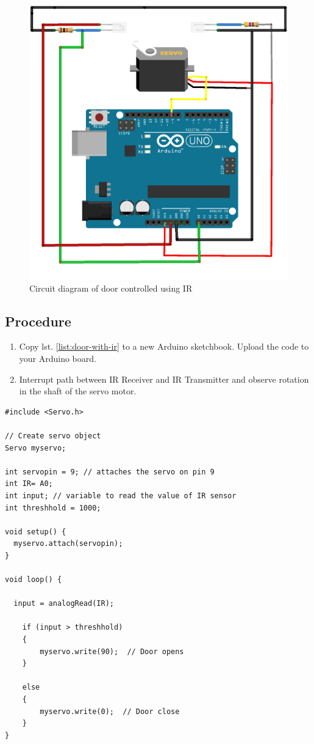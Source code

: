 	\begin{figure}[H]
	\centering \includegraphics[width=0.4\linewidth]{Figures/recreational_exp/IR serco door_bb.png}
	\caption{Circuit diagram of door controlled using IR}
	\end{figure}
	
\subsection*{Procedure}
\begin{enumerate}[leftmargin=*]
     \item Copy lst. \ref{list:door-with-ir} to a new Arduino sketchbook. Upload the code to your Arduino board.
    \item Interrupt path between IR Receiver and IR Transmitter and observe rotation in the shaft of the servo motor. 
    
\end{enumerate}

\begin{lstlisting}[language=Arduino, numbers=none, caption={Code for door with IR}, captionpos=b, label={list:door-with-ir}]
#include <Servo.h>

// Create servo object 
Servo myservo;  

int servopin = 9; // attaches the servo on pin 9 
int IR= A0; 
int input; // variable to read the value of IR sensor
int threshhold = 1000;

void setup() {
  myservo.attach(servopin);  
}

void loop() {

  input = analogRead(IR);

    if (input > threshhold)
    {
        myservo.write(90);  // Door opens    
    }

    else 
    {
        myservo.write(0);  // Door close
    } 
}
\end{lstlisting}


